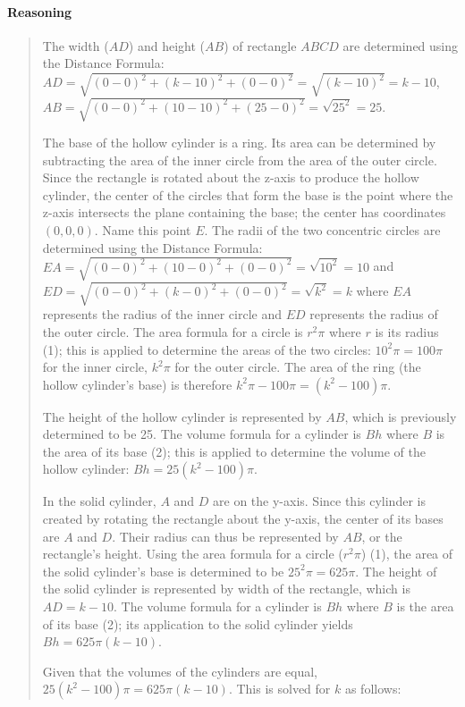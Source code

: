 \documentclass[letterpaper,12pt,twoside]{report}
\begin{document}
	\paragraph{Reasoning}
	\begin{quotation}
		
		The width ($AD$) and height ($AB$) of rectangle $ABCD$ are determined using the Distance Formula: $AD=\sqrt{(0-0)^2+(k-10)^2+(0-0)^2}=\sqrt{(k-10)^2}=k-10$, $AB=\sqrt{(0-0)^2+(10-10)^2+(25-0)^2}=\sqrt{25^2}=25$.
		
		The base of the hollow cylinder is a ring. Its area can be determined by subtracting the area of the inner circle from the area of the outer circle. Since the rectangle is rotated about the z-axis to produce the hollow cylinder, the center of the circles that form the base is the point where the z-axis intersects the plane containing the base; the center has coordinates $(0,0,0)$. Name this point $E$. The radii of the two concentric circles are determined using the Distance Formula: $EA=\sqrt{(0-0)^2+(10-0)^2+(0-0)^2}=\sqrt{10^2}=10$ and  $ED=\sqrt{(0-0)^2+(k-0)^2+(0-0)^2}=\sqrt{k^2}=k$ where $EA$ represents the radius of the inner circle and $ED$ represents the radius of the outer circle. The area formula for a circle is $r^2\pi$ where $r$ is its radius (1); this is applied to determine the areas of the two circles: $10^2\pi=100\pi$ for the inner circle, $k^2\pi$ for the outer circle. The area of the ring (the hollow cylinder's base) is therefore $k^2\pi-100\pi=(k^2-100)\pi$.
		
		The height of the hollow cylinder is represented by $AB$, which is previously determined to be 25. The volume formula for a cylinder is $Bh$ where $B$ is the area of its base (2); this is applied to determine the volume of the hollow cylinder: $Bh=25(k^2-100)\pi$.
		
		In the solid cylinder, $A$ and $D$ are on the y-axis. Since this cylinder is created by rotating the rectangle about the y-axis, the center of its bases are $A$ and $D$. Their radius can thus be represented by $AB$, or the rectangle's height. Using the area formula for a circle ($r^2\pi$) (1), the area of the solid cylinder's base is determined to be $25^2\pi=625\pi$. The height of the solid cylinder is represented by width of the rectangle, which is $AD=k-10$. The volume formula for a cylinder is $Bh$ where $B$ is the area of its base (2); its application to the solid cylinder yields $Bh=625\pi(k-10)$.
		
		Given that the volumes of the cylinders are equal, $25(k^2-100)\pi=625\pi(k-10)$. This is solved for $k$ as follows:
		

\end{quotation}
\end{document}

